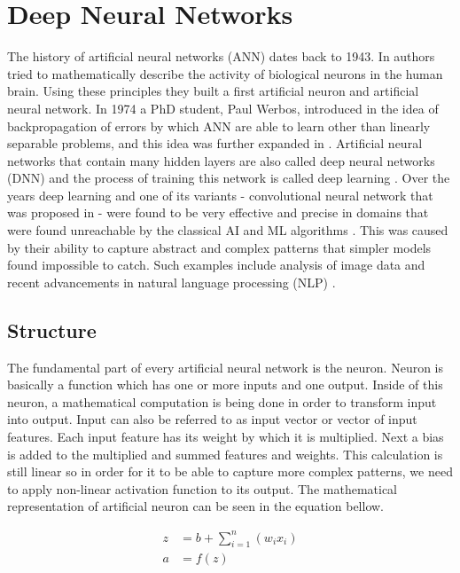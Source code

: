 \chapter{Deep Neural Networks}

The history of artificial neural networks (ANN) dates back to 1943. In \cite{McCulloch1943} authors tried to mathematically describe the activity of biological neurons in the human brain. Using these principles they built a first artificial neuron and artificial neural network. In 1974 a PhD student, Paul Werbos, introduced in \cite{Werbos1974} the idea of backpropagation of errors by which ANN are able to learn other than linearly separable problems, and this idea was further expanded in \cite{Rumelhart1986}. Artificial neural networks that contain many hidden layers are also called deep neural networks (DNN) and the process of training this network is called deep learning \cite{LeCun2015}. Over the years deep learning and one of its variants - convolutional neural network that was proposed in \cite{LeCun2015-2} - were found to be very effective and precise in domains that were found unreachable by the classical AI and ML algorithms \cite{LeCun2015}. This was caused by their ability to capture abstract and complex patterns that simpler models found impossible to catch. Such examples include analysis of image data \cite{Farabet2013, Alzubaidi2021} and recent advancements in natural language processing (NLP) \cite{Deng2018}.

\section{Structure}
The fundamental part of every artificial neural network is the neuron. Neuron is basically a function which has one or more inputs and one output. Inside of this neuron, a mathematical computation is being done in order to transform input into output. Input can also be referred to as input vector or vector of input features. Each input feature has its weight by which it is multiplied. Next a bias is added to the multiplied and summed features and weights. This calculation is still linear so in order for it to be able to capture more complex patterns, we need to apply non-linear activation function to its output. The mathematical representation of artificial neuron can be seen in the equation bellow.

\begin{align}
    z &= b + \sum_{i=1}^n (w_i x_i) \\
    a &= f(z)
\end{align}

